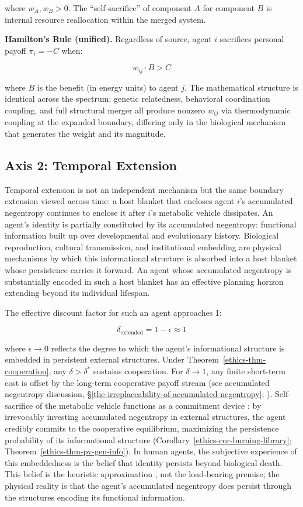 \documentclass[11pt]{article}
\theoremstyle{plain}
\theoremstyle{definition}
\theoremstyle{remark}
\let\origsubsection\subsection
\renewcommand{\subsection}{\needspace{7\baselineskip}\origsubsection}
\begin{document}
where \(w_A, w_B > 0\). The ``self-sacrifice'' of component \(A\) for
component \(B\) is internal resource reallocation within the merged
system.

\textbf{Hamilton's Rule (unified).} Regardless of source, agent \(i\)
sacrifices personal payoff \(\pi_i = -C\) when:

\[w_{ij} \cdot B > C\]

where \(B\) is the benefit (in energy units) to agent \(j\). The
mathematical structure is identical across the spectrum: genetic
relatedness, behavioral coordination coupling, and full structural
merger all produce nonzero \(w_{ij}\) via thermodynamic coupling at the
expanded boundary, differing only in the biological mechanism that
generates the weight and its magnitude.

\subsection{Axis 2: Temporal Extension}\label{axis-2-temporal-extension}

Temporal extension is not an independent mechanism but the same boundary
extension viewed across time: a host blanket that encloses agent \(i\)'s
accumulated negentropy continues to enclose it after \(i\)'s metabolic
vehicle dissipates. An agent's identity is partially constituted by its
accumulated negentropy: functional information built up over
developmental and evolutionary history. Biological reproduction,
cultural transmission, and institutional embedding are physical
mechanisms by which this informational structure is absorbed into a host
blanket whose persistence carries it forward. An agent whose accumulated
negentropy is substantially encoded in such a host blanket has an
effective planning horizon extending beyond its individual lifespan.

The effective discount factor for such an agent approaches 1:

\[\delta_{\text{extended}} = 1 - \epsilon \approx 1\]

where \(\epsilon \to 0\) reflects the degree to which the agent's
informational structure is embedded in persistent external structures.
Under Theorem~\ref{ethics-thm-cooperation}, any \(\delta > \delta^*\)
sustains cooperation. For \(\delta \to 1\), any finite short-term cost
is offset by the long-term cooperative payoff stream (see accumulated
negentropy discussion,
§\ref{the-irreplaceability-of-accumulated-negentropy}; \citep{TC-III}).
Self-sacrifice of the metabolic vehicle functions as a commitment device
\citep{Frank1988}: by irrevocably investing accumulated negentropy in
external structures, the agent credibly commits to the cooperative
equilibrium, maximizing the persistence probability of its informational
structure (Corollary~\ref{ethics-cor-burning-library};
Theorem~\ref{ethics-thm-pv-gen-info}). In human agents, the subjective
experience of this embeddedness is the belief that identity persists
beyond biological death. This belief is the heuristic approximation
\citep{Haidt2001, Gigerenzer2010}, not the load-bearing premise; the
physical reality is that the agent's accumulated negentropy does persist
through the structures encoding its functional information.
\end{document}
